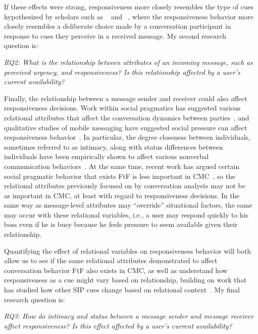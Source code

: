 \documentclass[12pt]{nuthesis}	%
\begin{document}
If these effects were strong, responsiveness more closely resembles the type of cues hypothesized by scholars such as ~\citet{walther1995nonverbal} and ~\citet{kalman2006pauses}, where the responsiveness behavior more closely resembles a deliberate choice made by a conversation participant in response to cues they perceive in a received message. My second research question is:

\textit{RQ2: What is the relationship between attributes of an incoming message, such as perceived urgency, and responsiveness? Is this relationship affected by a user's current availability?}

Finally, the relationship between a message sender and receiver could also affect responsiveness decisions. Work within social pragmatics has suggested various relational attributes that affect the conversation dynamics between parties~\citep{brown1987politeness,goldberg1990interrupting,west1979against,wolfson1990bulge}, and qualitative studies of mobile messaging have suggested social pressure can affect responsiveness behavior~\citep{church2013s}. In particular, the degree closeness between individuals, sometimes referred to as intimacy, along with status differences between individuals have been empirically shown to affect various nonverbal communication behaviors~\citep{guerrero1991waxing,henley1973power,leffler1982effects,sternglanz2004reading}.  At the same time, recent work has argued certain social pragmatic behavior that exists FtF is less important in CMC~\citep{schulze2017knowledge,stromer2015context}, so the relational attributes previously focused on by conversation analysts may not be as important in CMC, at least with regard to responsiveness decisions. In the same way as message-level attributes may ``override'' situational factors, the same may occur with these relational variables, i.e., a user may respond quickly to his boss even if he is busy because he feels pressure to seem available given their relationship.

Quantifying the effect of relational variables on responsiveness behavior will both allow us to see if the same relational attributes demonstrated to affect conversation behavior FtF also exists in CMC, as well as understand how responsiveness as a cue might vary based on relationship, building on work that has studied how other SIP cues change based on relational context~\citep[e.g.,][]{hancock2007expressing}. My final research question is:

\textit{RQ3: How do intimacy and status between a message sender and message receiver affect responsiveness? Is this effect affected by a user's current availability?}
\end{document}
